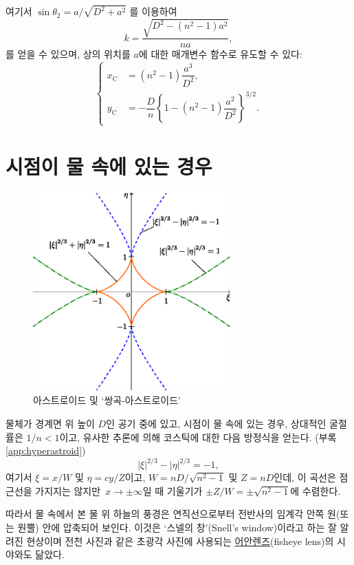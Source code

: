 \documentclass[twocolumn]{article}
\begin{document}
여기서
$\sin\theta_2 = {a}/{\sqrt{D^2+a^2}}$
를 이용하여
$$k = \dfrac{\sqrt{D^2-(n^2-1)a^2}}{na},$$
를 얻을 수 있으며, 
상의 위치를 $a$에 대한 매개변수 함수로 유도할 수 있다:
$$ \left\{ 
\begin{aligned}
	x_{\mathrm{C}}^{} &= (n^2-1)\dfrac{a^3}{D^2},\\
	y_{\mathrm{C}}^{}
	&= -\dfrac{D}{n}\left\{ 1-(n^2-1)\dfrac{a^2}{D^2} \right\}^{3/2}.
\end{aligned}
\right.$$

\section{시점이 물 속에 있는 경우}

\begin{figure}
	\centering
	\includegraphics[width=3in]{figs/g254.eps}
	\caption{아스트로이드 및 `쌍곡-아스트로이드'}
	\label{fig:hyperastroid}
\end{figure}

물체가 경계면 위 높이 $D$인 공기 중에 있고, 
시점이 물 속에 있는 경우, 상대적인 굴절률은 $1/n < 1$이고, 
유사한 추론에 의해 코스틱에 대한 다음 방정식을 얻는다. (부록 \ref{app:hyperastroid})
$$ \left| \xi \right|^{2/3} - \left| \eta \right|^{2/3} = -1, $$
여기서 $\xi = {x}/{W} $ 및 $\eta = c{y}/{Z}$이고, 
$W = {nD}/{\sqrt{n^2-1}}$ 및 $Z = nD$인데,  
이 곡선은 점근선을 가지지는 않지만 $x\rightarrow\pm\infty$일 때 
기울기가 $\pm Z/W = \pm \sqrt{n^2-1}$에 수렴한다.

따라서 물 속에서 본 물 위 하늘의 풍경은
연직선으로부터 전반사의 임계각 안쪽 원(또는 원뿔) 안에 압축되어 보인다. 이것은 
`스넬의 창'(Snell's window)이라고 하는 잘 알려진 현상이며 전천 사진과 같은 초광각 
사진에 사용되는 \href{https://ko.wikipedia.org/wiki/%EC%96%B4%EC%95%88_%EB%A0%8C%EC%A6%88}{어안렌즈}(fisheye lens)의 시야와도 닮았다.
\end{document}
